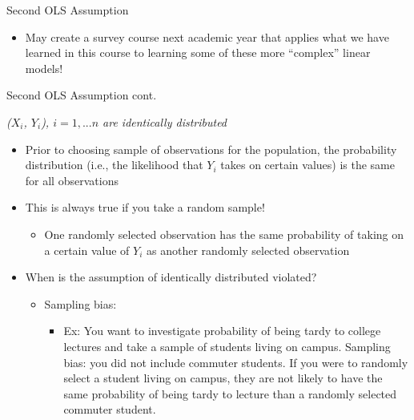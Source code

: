 \documentclass[
  8pt,
  ignorenonframetext,
  dvipsnames]{beamer}
\providecommand{\tightlist}{%
  \setlength{\itemsep}{0pt}\setlength{\parskip}{0pt}}
\let\olditem\item
\renewcommand{\item}{%
  \olditem\vspace{4pt}
}
\begin{document}
\begin{frame}{Second OLS Assumption}
\begin{itemize}
  \begin{itemize}
  \tightlist
  \item
    May create a survey course next academic year that applies what we
    have learned in this course to learning some of these more
    ``complex'' linear models!
  \end{itemize}
\end{itemize}

\end{frame}

\begin{frame}{Second OLS Assumption cont.}
\protect\hypertarget{second-ols-assumption-cont.}{}

\emph{(\(X_i\), \(Y_i\)), \(i=1, ...n\) are identically distributed}

\begin{itemize}
\tightlist
\item
  Prior to choosing sample of observations for the population, the
  probability distribution (i.e., the likelihood that \(Y_i\) takes on
  certain values) is the same for all observations
\item
  This is always true if you take a random sample!

  \begin{itemize}
  \tightlist
  \item
    One randomly selected observation has the same probability of taking
    on a certain value of \(Y_i\) as another randomly selected
    observation
  \end{itemize}
\item
  When is the assumption of identically distributed violated?

  \begin{itemize}
  \tightlist
  \item
    Sampling bias:

    \begin{itemize}
    \tightlist
    \item
      Ex: You want to investigate probability of being tardy to college
      lectures and take a sample of students living on campus. Sampling
      bias: you did not include commuter students. If you were to
      randomly select a student living on campus, they are not likely to
      have the same probability of being tardy to lecture than a
      randomly selected commuter student.
    \end{itemize}
  \end{itemize}
\end{itemize}

\end{frame}
\end{document}
